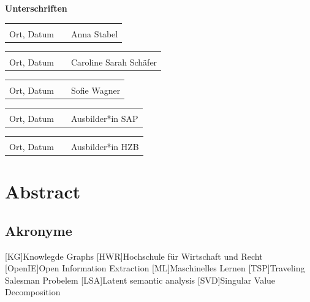 \documentclass[12pt, oneside]{article}
\newcommand{\studentNameOne}{Anna Stabel}
\newcommand{\studentNameTwo}{Caroline Sarah Schäfer}
\newcommand{\studentNameThree}{Sofie Wagner}
\begin{document}
\newpage
\textbf{Unterschriften}
\newline

\begin{tabular}{lp{4em}l} 
 \hspace{5cm}   && \hspace{4cm} \\\cline{1-1}\cline{3-3} 
Ort, Datum     && \studentNameOne 
\end{tabular}

\begin{tabular}{lp{4em}l} 
 \hspace{5cm}   && \hspace{4cm} \\\cline{1-1}\cline{3-3} 
Ort, Datum     && \studentNameTwo
\end{tabular}

\begin{tabular}{lp{4em}l} 
 \hspace{5cm}   && \hspace{4cm} \\\cline{1-1}\cline{3-3} 
Ort, Datum     && \studentNameThree 
\end{tabular}

\begin{tabular}{lp{4em}l} 
 \hspace{5cm}   && \hspace{4cm} \\\cline{1-1}\cline{3-3} 
Ort, Datum     && Ausbilder*in SAP 
\end{tabular}

\begin{tabular}{lp{4em}l} 
 \hspace{5cm}   && \hspace{4cm} \\\cline{1-1}\cline{3-3} 
Ort, Datum     && Ausbilder*in HZB
\end{tabular}

\newpage

\section*{Abstract}
%
\noindent


\newpage

\tableofcontents
\newpage

\begin{acronym}[ECU]
\section*{Akronyme}

    [KG]{Knowlegde Graphs}
    [HWR]{Hochschule für Wirtschaft und Recht}
    [OpenIE]{Open Information Extraction}
    [ML]{Maschinelles Lernen}
    [TSP]{Traveling Salesman Probelem}
    [LSA]{Latent semantic analysis}
    [SVD]{Singular Value Decomposition}
\end{acronym}
\end{document}
